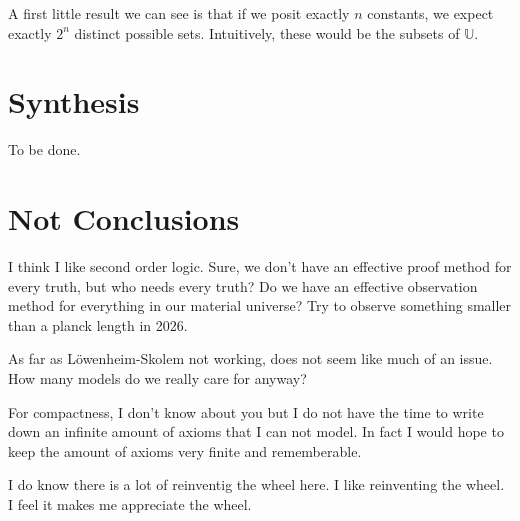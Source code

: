 \documentclass[11pt]{article}
\theoremstyle{plain}
\theoremstyle{nonumberplain}
\newcommand{\U}{\mathbb{U}}
\begin{document}
A first little result we can see is that if we posit exactly $n$ constants, we expect exactly $2^n$ distinct possible sets. Intuitively, these would be the subsets of $\U$.

\section{Synthesis}

To be done.

\section{Not Conclusions}

I think I like second order logic. Sure, we don't have an effective proof method for every truth, but who needs every truth? Do we have an effective observation method for everything in our material universe? Try to observe something smaller than a planck length in 2026.

As far as Löwenheim-Skolem not working, does not seem like much of an issue. How many models do we really care for anyway? 

For compactness, I don't know about you but I do not have the time to write down an infinite amount of axioms that I can not model. In fact I would hope to keep the amount of axioms very finite and rememberable.

I do know there is a lot of reinventig the wheel here. I like reinventing the wheel. I feel it makes me appreciate the wheel.
\end{document}
